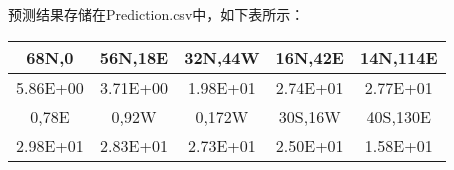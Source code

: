 \documentclass{article}
\begin{document}
    预测结果存储在Prediction.csv中，如下表所示：

    \begin{tabular}{|c|c|c|c|c|}
        \hline
        68N,0&56N,18E&32N,44W&16N,42E&14N,114E\\
        \hline
        5.86E+00&3.71E+00&1.98E+01&2.74E+01&2.77E+01\\
        \hline
        0,78E&0,92W&0,172W&30S,16W&40S,130E\\
        \hline
        2.98E+01&2.83E+01&2.73E+01&2.50E+01&1.58E+01\\
        \hline
    \end{tabular}
\end{document}
